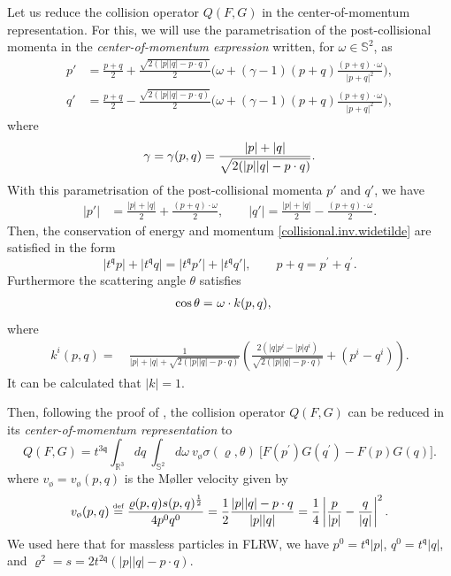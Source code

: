 \documentclass[reqno]{amsart}
\newcommand{\eqdef }{\overset{\mbox{\tiny{def}}}{=}}
\newcommand{\pv}{p}
\newcommand{\pZ}{|\pv|}
\newcommand{\qv}{q}
\newcommand{\qZ}{|\qv|}
\newcommand{\qq}{\mathfrak{q}}
\newcommand{\tq}{t^{\qq}}
\newcommand{\tqq}{t^{2\qq}}
\newcommand{\tTq}{t^{3\qq}}
\newcommand{\Emptyset}{\text{\o}}
\newcommand{\mrel}{\varrho}
\theoremstyle{definition}
\numberwithin{equation}{section}
\numberwithin{theorem}{section}
\begin{document}
Let us reduce the collision operator \(Q(F,G)\) in the center-of-momentum representation. For this, we will use the parametrisation of the post-collisional momenta in the \emph{center-of-momentum expression} written, for \(\omega\in \mathbb{S}^2\), as
\begin{align}
p'
&=\frac{p+q}{2}+\frac{\sqrt{2(|\pv| |\qv| - \pv \cdot \qv)}}{{2}}\bigg(\omega+(\gamma-1)(p+q)\frac{(p+q)\cdot \omega}{|p+q|^2}\bigg), \label{pprimedefcm}\\
q'
&=\frac{p+q}{2}-\frac{\sqrt{2(|\pv| |\qv| - \pv \cdot \qv)}}{{2}}\bigg(\omega+(\gamma-1)(p+q)\frac{(p+q)\cdot \omega}{|p+q|^2}\bigg),\label{qprimedefcm}
\end{align}
where
\begin{align}\notag 
    \gamma =\gamma (p,q)=\frac{|p|+|q|}{\sqrt{2 (\pZ \qZ - p\cdot q )}}.
\end{align}
 With this parametrisation of the post-collisional momenta
\(p'\) and \(q'\), we have
\begin{align*}
|p'|&=\frac{|p|+|q|}{2}+\frac{(p+q)\cdot \omega}{2},\qquad
|q'|=\frac{|p|+|q|}{2}-\frac{(p+q)\cdot \omega}{2}.
\end{align*}
Then, the conservation of energy and momentum \eqref{collisional.inv.widetilde} are satisfied in the form
 \begin{equation}
 |\tq p|+|\tq q|  =|\tq p'|+|\tq q'|,\qquad  
  p+ q  =p^{\prime}+q^{\prime}.
 \label{collisionalCONSERVATION}
 \end{equation}
Furthermore the scattering angle $\theta$ satisfies
\begin{align}\notag 
\cos\theta
= &~
  \omega \cdot k(p,q),
\end{align}
where 
\begin{align*}
     k^i(p,q)
= &~ 
      \frac{1 }{|\pv|+|\qv|+{\sqrt{2  \left(|\pv| |\qv| - \pv \cdot \qv \right)}}}\left(\frac{2\left(|\qv|\pv^{i} -  |\pv|\qv^{i}\right)}{{\sqrt{2  \left(|\pv| |\qv| - \pv \cdot \qv \right)}}}     
     + \left(\pv^{i} - \qv^{i} \right) \right).
\end{align*}
It can be calculated that $|k| =1$.

Then, following the proof of \cite[Theorem 2 and Corollary 3]{MR2765751}, the collision operator \(Q(F,G)\) can be reduced in its \emph{center-of-momentum representation} to 
\begin{equation}
Q(F,G)
=
\tTq\int_{\mathbb{R}^3}  {dq}  ~
\int_{\mathbb{S}^{2}} d\omega 
~ v_{\Emptyset}  \sigma (\mrel,\theta ) ~ \big[F(p^{\prime })G(q^{\prime})-F(p)G(q)\big].
\label{collisionCMc}
\end{equation}
where \(v_{\Emptyset}=v_{\Emptyset}(p,q)\) is the Møller velocity given by
\begin{equation}\label{moller}
v_{\Emptyset}(p,q)\eqdef \frac{\mrel(p,q)s(p,q)^{\frac{1}{2}}}{4p^0q^0}
=\frac{1}{2} \frac{|\pv| |\qv| - \pv \cdot \qv}{|\pv| |\qv|}
=
\frac{1}{4}\left| \frac{\pv}{\pZ} -\frac{\qv}{\qZ}\right|^2. 
\end{equation}
We used here that for massless particles in FLRW, we have \( \pv^{0}=\tq |\pv|\), \(\qv^{0}=\tq |\qv|\), and \(\mrel^2 
 =s=2 \tqq \left(|\pv| |\qv| - \pv \cdot \qv \right).\)
\end{document}
